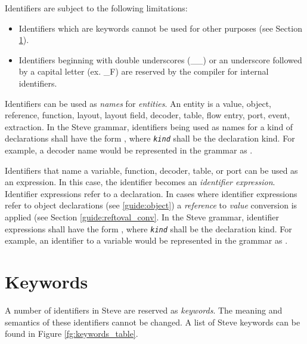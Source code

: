 Identifiers are subject to the following limitations:

\begin{itemize}
\item Identifiers which are keywords cannot be used for other purposes (see Section \ref{guide:keyword}).

\item Identifiers beginning with double underscores (\_\_) or an underscore followed by a capital letter (ex. \_F) are reserved by the compiler for internal identifiers.
\end{itemize}

Identifiers can be used as \textit{names} for \textit{entities}. An entity is a value, object, reference, function, layout, layout field, decoder, table, flow entry, port, event, extraction. In the Steve grammar, identifiers being used as names for a kind of declarations shall have the form , where \texttt{\textit{kind}} shall be the declaration kind. For example, a decoder name would be represented in the grammar as .

Identifiers that name a variable, function, decoder, table, or port can be used as an expression. In this case, the identifier becomes an \textit{identifier expression}. Identifier expressions refer to a declaration. In cases where identifier expressions refer to object declarations (see \ref{guide:object}) a \textit{reference} to \textit{value} conversion is applied (see Section \ref{guide:reftoval_conv}. In the Steve grammar, identifier expressions shall have the form , where \texttt{\textit{kind}} shall be the declaration kind. For example, an identifier to a variable would be represented in the grammar as .

\section{Keywords} \label{guide:keyword}

A number of identifiers in Steve are reserved as \textit{keywords}. The meaning and semantics of these identifiers cannot be changed. A list of Steve keywords can be found in Figure \ref{fg:keywords_table}.

